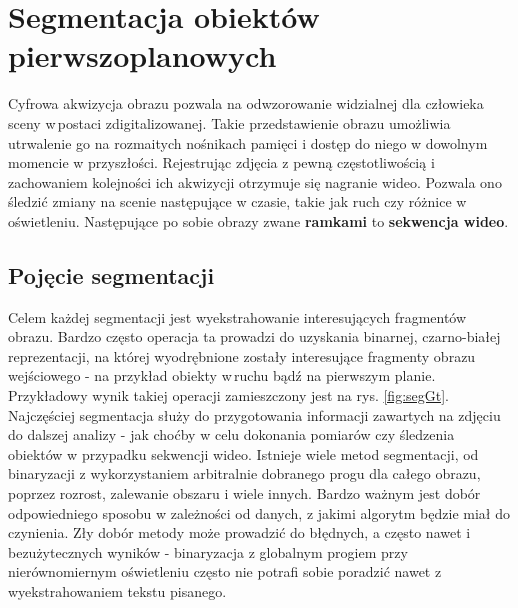 \chapter{Segmentacja obiektów pierwszoplanowych}
\label{cha:tematykaPracy}
Cyfrowa akwizycja obrazu pozwala na odwzorowanie widzialnej dla człowieka sceny w\,postaci zdigitalizowanej. Takie przedstawienie obrazu umożliwia utrwalenie go na rozmaitych nośnikach pamięci i dostęp do niego w dowolnym momencie w przyszłości. Rejestrując zdjęcia z pewną częstotliwością i zachowaniem kolejności ich akwizycji otrzymuje się nagranie wideo. Pozwala ono śledzić zmiany na scenie następujące w czasie, takie jak ruch czy różnice w oświetleniu. Następujące po sobie obrazy zwane \textbf{ramkami} to \textbf{sekwencja wideo}.

\section{Pojęcie segmentacji}
Celem każdej segmentacji jest wyekstrahowanie interesujących fragmentów obrazu. Bardzo często operacja ta prowadzi do uzyskania binarnej, czarno-białej reprezentacji, na której wyodrębnione zostały interesujące fragmenty obrazu wejściowego - na przykład obiekty w\,ruchu bądź na pierwszym planie. Przykładowy wynik takiej operacji zamieszczony jest na rys. \ref{fig:segGt}. Najczęściej segmentacja służy do przygotowania informacji zawartych na zdjęciu do dalszej analizy - jak choćby w celu dokonania pomiarów czy śledzenia obiektów w przypadku sekwencji wideo. Istnieje wiele metod segmentacji, od binaryzacji z wykorzystaniem arbitralnie dobranego progu dla całego obrazu, poprzez rozrost, zalewanie obszaru i wiele innych. Bardzo ważnym jest dobór odpowiedniego sposobu w zależności od danych, z jakimi algorytm będzie miał do czynienia. Zły dobór metody może prowadzić do błędnych, a często nawet i bezużytecznych wyników - binaryzacja z globalnym progiem przy nierównomiernym oświetleniu często nie potrafi sobie poradzić nawet z wyekstrahowaniem tekstu pisanego.

